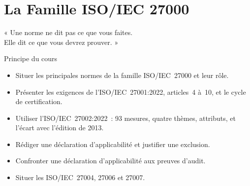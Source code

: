 
\chapter{La Famille ISO/IEC 27000}
\label{chap:iso27000}

\epigraph{%
    « Une norme ne dit pas ce que vous faites.\\
    Elle dit ce que vous devrez prouver. »%
}{Principe du cours}


\begin{boxobjectifs}
\begin{itemize}
    \item Situer les principales normes de la famille ISO/IEC~27000 et leur
          rôle.
    \item Présenter les exigences de l'ISO/IEC~27001:2022, articles~4 à~10,
          et le cycle de certification.
    \item Utiliser l'ISO/IEC~27002:2022~: 93 mesures, quatre thèmes,
          attributs, et l'écart avec l'édition de 2013.
    \item Rédiger une déclaration d'applicabilité et justifier une
          exclusion.
    \item Confronter une déclaration d'applicabilité aux preuves d'audit.
    \item Situer les ISO/IEC~27004, 27006 et 27007.
\end{itemize}
\end{boxobjectifs}

